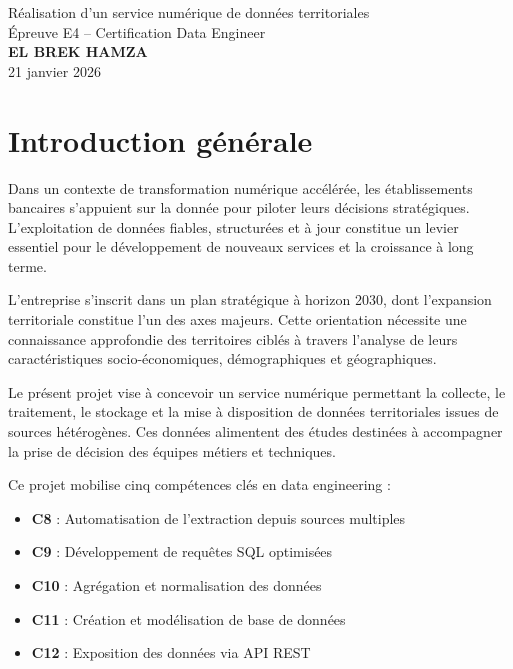 \documentclass[12pt,a4paper]{article}
\begin{document}
\begin{center}
    \vspace*{1cm}
    {\Large Réalisation d'un service numérique de données territoriales}\\[0.4cm]
    {\large Épreuve E4 -- Certification Data Engineer}\\[1cm]
    {\large \textbf{EL BREK HAMZA}}\\[0.3cm]
    {\normalsize 21 janvier 2026}
\end{center}

\vspace{1cm}
\tableofcontents
\newpage

\section*{Introduction générale}

Dans un contexte de transformation numérique accélérée, les établissements bancaires s'appuient sur la donnée pour piloter leurs décisions stratégiques. L'exploitation de données fiables, structurées et à jour constitue un levier essentiel pour le développement de nouveaux services et la croissance à long terme.

L'entreprise s'inscrit dans un plan stratégique à horizon 2030, dont l'expansion territoriale constitue l'un des axes majeurs. Cette orientation nécessite une connaissance approfondie des territoires ciblés à travers l'analyse de leurs caractéristiques socio-économiques, démographiques et géographiques.

Le présent projet vise à concevoir un service numérique permettant la collecte, le traitement, le stockage et la mise à disposition de données territoriales issues de sources hétérogènes. Ces données alimentent des études destinées à accompagner la prise de décision des équipes métiers et techniques.

Ce projet mobilise cinq compétences clés en data engineering :
\begin{itemize}
    \item \textbf{C8} : Automatisation de l'extraction depuis sources multiples
    \item \textbf{C9} : Développement de requêtes SQL optimisées
    \item \textbf{C10} : Agrégation et normalisation des données
    \item \textbf{C11} : Création et modélisation de base de données
    \item \textbf{C12} : Exposition des données via API REST
\end{itemize}
\end{document}
